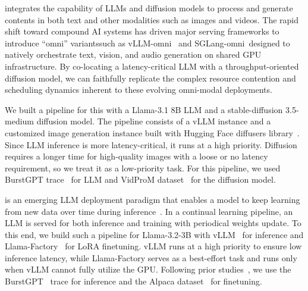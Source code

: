  integrates the capability of LLMs and diffusion models to process and generate contents in both text and other modalities such as images and videos. The rapid shift toward compound AI systems has driven major serving frameworks to introduce ``omni'' variants\textemdash such as vLLM-omni~\cite{vllm-omni} and SGLang-omni~\cite{sglang-omni}\textemdash designed to natively orchestrate text, vision, and audio generation on shared GPU infrastructure. By co-locating a latency-critical LLM with a throughput-oriented diffusion model, we can faithfully replicate the complex resource contention and scheduling dynamics inherent to these evolving omni-modal deployments.

We built a pipeline for this with a Llama-3.1 8B LLM and a stable-diffusion 3.5-medium diffusion model. The pipeline consists of a vLLM instance and a customized image generation instance built with Hugging Face diffusers library~\cite{huggingfaceDiffusers}. Since LLM inference is more latency-critical, it runs at a high priority. Diffusion requires a longer time for high-quality images with a loose or no latency requirement, so we treat it as a low-priority task.
For this pipeline, we used BurstGPT trace~\cite{burstgpt} for LLM and VidProM dataset~\cite{wang2024vidprommillionscalerealpromptgallery} for the diffusion model.



is an emerging LLM deployment paradigm that enables a model to keep learning from new data over time during inference~\cite{jayasuriya2025sparcsubspaceawarepromptadaptation,pcl-continual-learning@www25}. In a continual learning pipeline, an LLM is served for both inference and training with periodical weights update.
To this end, we build such a pipeline for Llama-3.2-3B with vLLM~\cite{vllm@sosp23} for inference and Llama-Factory~\cite{zheng2024llamafactory} for LoRA finetuning. vLLM runs at a high priority to ensure low inference latency, while Llama-Factory serves as a best-effort task and runs only when vLLM cannot fully utilize the GPU.
Following prior studies~\cite{blitzscale@osdi25}, we use the BurstGPT~\cite{burstgpt} trace for inference and the Alpaca dataset~\cite{alpaca@github} for finetuning.

